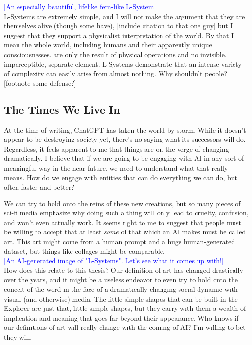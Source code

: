 \documentclass[12pt,twoside]{reedthesis}
\begin{document}
	\textcolor{blue}{[An especially beautiful, lifelike fern-like L-System]}\\
	
	L-Systems are extremely simple, and I will not make the argument that they are themselves alive (though some have), [include citation to that one guy] but I suggest that they support a physicalist interpretation of the world. By that I mean the whole world, including humans and their apparently unique consciousnesses, are only the result of physical operations and no invisible, imperceptible, separate element. L-Systems demonstrate that an intense variety of complexity can easily arise from almost nothing. Why shouldn't people? [footnote some defense?]

\subsection{The Times We Live In} %
\label{AI-Art}

	At the time of writing, ChatGPT has taken the world by storm. While it doesn't appear to be destroying society yet, there's no saying what its successors will do. Regardless, it feels apparent to me that things are on the verge of changing dramatically. I believe that if we are going to be engaging with AI in any sort of meaningful way in the near future, we need to understand what that really means. How do we engage with entities that can do everything we can do, but often faster and better?
	
	We can try to hold onto the reins of these new creations, but so many pieces of sci-fi media emphasize why doing such a thing will only lead to cruelty, confusion, and won't even actually work. It seems right to me to suggest that people must be willing to accept that at least \textit{some} of that which an AI makes must be called art. This art might come from a human prompt and a huge human-generated dataset, but things like collages might be comparable.\\
	
	\textcolor{blue}{[An AI-generated image of "L-Systems". Let's see what it comes up with!]}\\
	
	How does this relate to this thesis? Our definition of art has changed drastically over the years, and it might be a useless endeavor to even try to hold onto the conceit of the word in the face of a dramatically changing social dynamic with visual (and otherwise) media. The little simple shapes that can be built in the Explorer are just that, little simple shapes, but they carry with them a wealth of implication and meaning that goes far beyond their appearance. Who knows if our definitions of art will really change with the coming of AI? I'm willing to bet they will.
\end{document}
